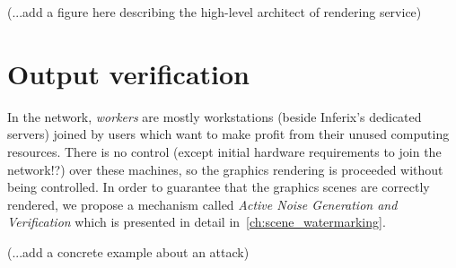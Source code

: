 (...add a figure here describing the high-level architect of rendering service)

\section[Output verification]{Output verification}\label{sec:output_verification}
In the network, \emph{workers} are mostly workstations (beside Inferix's dedicated servers) joined by users which want to make profit from their unused computing resources. There is no control (except initial hardware requirements to join the network!?) over these machines, so the graphics rendering is proceeded without being controlled. In order to guarantee that the graphics scenes are correctly rendered, we propose a mechanism called \emph{Active Noise Generation and Verification} which is presented in detail in~\autoref{ch:scene_watermarking}.

(...add a concrete example about an attack)